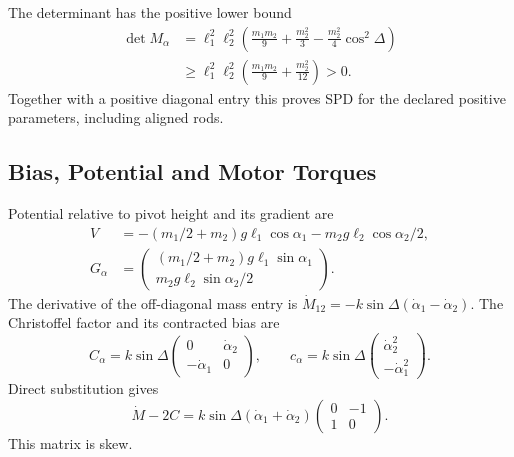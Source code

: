 The determinant has the positive lower bound
\begin{equation}
\begin{aligned}
\det M_\alpha&=\ell_1^2\ell_2^2
\left(\frac{m_1m_2}{9}+\frac{m_2^2}{3}
-\frac{m_2^2}{4}\cos^2\Delta\right)\\
&\geq\ell_1^2\ell_2^2\left(\frac{m_1m_2}{9}+\frac{m_2^2}{12}\right)>0.
\end{aligned}
\label{eq:lagrangian_rods_spd}
\end{equation}
Together with a positive diagonal entry this proves SPD for the declared positive parameters, including aligned rods.

\subsection{Bias, Potential and Motor Torques}
\label{subsec:lagrangian_rods_forces}

Potential relative to pivot height and its gradient are
\begin{equation}
\begin{aligned}
V&=-(m_1/2+m_2)g\ell_1\cos\alpha_1
-m_2g\ell_2\cos\alpha_2/2,\\
G_\alpha&=\begin{pmatrix}
(m_1/2+m_2)g\ell_1\sin\alpha_1\\
m_2g\ell_2\sin\alpha_2/2
\end{pmatrix}.
\end{aligned}
\label{eq:lagrangian_rods_potential}
\end{equation}
The derivative of the off-diagonal mass entry is $\dot M_{12}=-k\sin\Delta(\dot\alpha_1-\dot\alpha_2)$. The Christoffel factor and its contracted bias are
\begin{equation}
C_\alpha=k\sin\Delta
\begin{pmatrix}0&\dot\alpha_2\\-\dot\alpha_1&0\end{pmatrix},
\qquad c_\alpha=k\sin\Delta
\begin{pmatrix}\dot\alpha_2^2\\-\dot\alpha_1^2\end{pmatrix}.
\label{eq:lagrangian_rods_bias}
\end{equation}
Direct substitution gives
\begin{equation}
\dot M-2C=k\sin\Delta(\dot\alpha_1+\dot\alpha_2)\left(\begin{smallmatrix}0&-1\\1&0\end{smallmatrix}\right)
.
\end{equation}
This matrix is skew.

